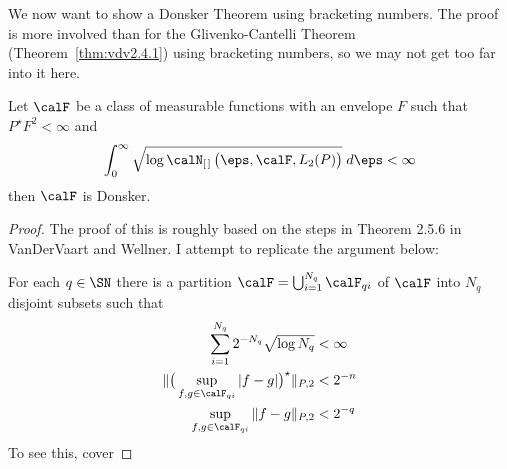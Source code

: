 
We now want to show a Donsker Theorem using bracketing numbers. The proof is more involved than for the Glivenko-Cantelli Theorem (Theorem~\ref{thm:vdv2.4.1}) using bracketing numbers, so we may not get too far into it here.

\begin{theorem}
	\label{thm:donsker-bracketing}
	Let \(\calF\) be a class of measurable functions with an envelope \(F\) such that \(P^\star F^2 < \infty\) and
	\begin{equation}
		\label{eq:donsker-bracketing-condition}
		\int_{0}^{\infty} \sqrt{\log\calN_{[\hspace{0.1em}]}\left(\eps,\calF,L_2(P)\right)}\;d\eps <\infty
	\end{equation}
	then \(\calF\) is Donsker.
\end{theorem}
\begin{proof}
	The proof of this is roughly based on the steps in Theorem 2.5.6 in VanDerVaart and Wellner. I attempt to replicate the argument below:

	For each \(q\in\SN\) there is a partition \(\calF = \bigcup_{i=1}^{N_q} \calF_{qi}\) of \(\calF\) into \(N_q\) disjoint subsets such that 
	\begin{align*}
		\sum_{i=1}^{N_q} 2^{-N_q} \sqrt{\log N_q} &< \infty \\
		\|\big(\sup_{f,g\in\calF_{qi}}|f-g|\big)^\star\|_{P,2} &< 2^{-n} \\
		\sup_{f,g\in\calF_{qi}} \|f-g\|_{P,2} &< 2^{-q}
	\end{align*}
	To see this, cover   
\end{proof}

